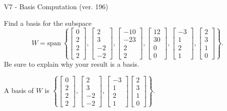 \begin{exercise}
  \begin{exerciseTitle}V7 - Basis Computation (ver. 196)\end{exerciseTitle}
  \begin{exerciseStatement}
    Find a basis for the subspace 
\[W=\mathrm{span}\ \left\{\left[\begin{array}{r}
0 \\
2 \\
2 \\
2
\end{array}\right] , \left[\begin{array}{r}
2 \\
3 \\
-2 \\
-2
\end{array}\right] , \left[\begin{array}{r}
-10 \\
-23 \\
2 \\
2
\end{array}\right] , \left[\begin{array}{r}
12 \\
30 \\
0 \\
0
\end{array}\right] , \left[\begin{array}{r}
-3 \\
1 \\
2 \\
1
\end{array}\right] , \left[\begin{array}{r}
2 \\
3 \\
1 \\
0
\end{array}\right]\right\}.\]
 Be sure to explain why your result is a basis.


  \end{exerciseStatement}
  \begin{exerciseAnswer}
   A basis of \(W\) is  \(\left\{\left[\begin{array}{r}
0 \\
2 \\
2 \\
2
\end{array}\right] , \left[\begin{array}{r}
2 \\
3 \\
-2 \\
-2
\end{array}\right] , \left[\begin{array}{r}
-3 \\
1 \\
2 \\
1
\end{array}\right] \left[\begin{array}{r}
2 \\
3 \\
1 \\
0
\end{array}\right]\right\}\).
  


  \end{exerciseAnswer}
\end{exercise}